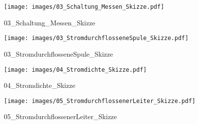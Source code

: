 %
%
\begin{figure}[!hb]%
    \centering
  \texttt{[image: images/03\_Schaltung\_Messen\_Skizze.pdf]}%
  \caption{03_Schaltung_Messen_Skizze}%
\end{figure}

%
%
\begin{figure}[!hb]%
    \centering
  \texttt{[image: images/03\_StromdurchflosseneSpule\_Skizze.pdf]}%
  \caption{03_StromdurchflosseneSpule_Skizze}%
\end{figure}

%
%
\begin{figure}[!hb]%
    \centering
  \texttt{[image: images/04\_Stromdichte\_Skizze.pdf]}%
  \caption{04_Stromdichte_Skizze}%
\end{figure}

%
%
\begin{figure}[!hb]%
    \centering
  \texttt{[image: images/05\_StromdurchflossenerLeiter\_Skizze.pdf]}%
  \caption{05_StromdurchflossenerLeiter_Skizze}%
\end{figure}

